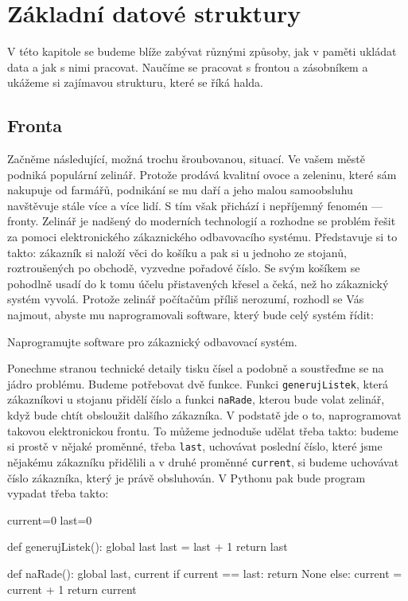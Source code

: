 \ifx\ucebnice\undefined

\setcounter{section}{1}
\fi
\section{Základní datové struktury}

V této kapitole se budeme blíže zabývat různými způsoby, jak v paměti ukládat data a jak s nimi pracovat. Naučíme se
pracovat s frontou a zásobníkem a ukážeme si zajímavou strukturu, které se říká halda. 

\subsection*{Fronta} 

Začněme následující, možná trochu šroubovanou, situací. Ve vašem městě podniká populární zelinář. Protože prodává kvalitní ovoce a zeleninu, 
které sám nakupuje od farmářů, podnikání se mu daří a jeho malou samoobsluhu navštěvuje stále více a více lidí. S tím však 
přichází i nepříjemný fenomén --- fronty. Zelinář je nadšený do moderních technologií a rozhodne se problém řešit za pomoci
elektronického zákaznického odbavovacího systému. Představuje si to takto: zákazník si naloží věci do košíku a pak si u jednoho ze stojanů,
roztroušených po obchodě, vyzvedne pořadové číslo. Se svým košíkem se pohodlně usadí do k tomu účelu přistavených
křesel a čeká, než ho zákaznický systém vyvolá. Protože zelinář počítačům příliš nerozumí, rozhodl se Vás najmout, abyste
mu naprogramovali software, který bude celý systém řídit:

\begin{question} Naprogramujte software pro zákaznický odbavovací systém.
\end{question}

Ponechme stranou technické detaily tisku čísel a podobně a soustřeďme se na jádro problému. Budeme potřebovat dvě funkce. Funkci
{\tt generujListek}, která zákazníkovi u stojanu přidělí číslo a funkci {\tt naRade}, kterou bude volat zelinář, když bude chtít
obsloužit dalšího zákazníka. V podstatě jde o to, naprogramovat takovou elektronickou frontu. To můžeme jednoduše udělat třeba
takto: budeme si prostě v nějaké proměnné, třeba {\tt last},  uchovávat poslední číslo, které jsme nějakému zákazníku přidělili a v druhé
proměnné {\tt current}, si budeme uchovávat číslo zákazníka, který je právě obsluhován. V Pythonu pak bude program vypadat třeba
takto:

\begin{python}
current=0
last=0

def generujListek():
    global last
    last = last + 1
    return last
    
def naRade():
    global last, current
    if current == last:
        return None
    else:
        current = current + 1
    return current
\end{python}

